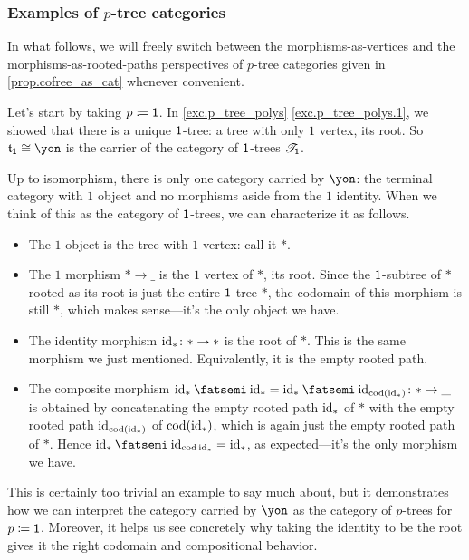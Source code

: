 \documentclass[Book-Poly]{subfiles}
\begin{document}
\subsubsection{Examples of $p$-tree categories}

In what follows, we will freely switch between the morphisms-as-vertices and the morphisms-as-rooted-paths perspectives of $p$-tree categories given in \cref{prop.cofree_as_cat} whenever convenient.

\begin{example}
Let's start by taking $p\coloneqq\textsf{1}$.
In \cref{exc.p_tree_polys} \cref{exc.p_tree_polys.1}, we showed that there is a unique $\textsf{1}$-tree: a tree with only $1$ vertex, its root.
So $\ema{t}_\1\iso\yon$ is the carrier of the category of $\textsf{1}$-trees $\mathscr{T}_{\textsf{1}}$.

Up to isomorphism, there is only one category carried by $\yon$: the terminal category with $1$ object and no morphisms aside from the $1$ identity.
When we think of this as the category of $\textsf{1}$-trees, we can characterize it as follows.
\begin{itemize}
    \item The $1$ object is the tree with $1$ vertex: call it $\ast$.
    \item The $1$ morphism $\ast\to\_$ is the $1$ vertex of $\ast$, its root.
    Since the $\textsf{1}$-subtree of $\ast$ rooted as its root is just the entire $\textsf{1}$-tree $\ast$, the codomain of this morphism is still $\ast$, which makes sense---it's the only object we have.
    \item The identity morphism $\mathrm{id}_\ast\colon\ast\to\ast$ is the root of $\ast$.
    This is the same morphism we just mentioned.
    Equivalently, it is the empty rooted path.
    \item The composite morphism $\id_\ast\then\id_\ast=\id_\ast\then\id_{\cod(\id_\ast)}\colon\ast\to\_$ is obtained by concatenating the empty rooted path $\mathrm{id}_\ast$ of $\ast$ with the empty rooted path $\mathrm{id}_{\operatorname{cod}(\mathrm{id}_\ast)}$ of $\operatorname{cod}(\mathrm{id}_\ast)$, which is again just the empty rooted path of $\ast$.
    Hence $\id_\ast\then\id_{\cod\id_\ast}=\id_\ast$, as expected---it's the only morphism we have.
\end{itemize}
This is certainly too trivial an example to say much about, but it demonstrates how we can interpret the category carried by $\yon$ as the category of $p$-trees for $p\coloneqq\textsf{1}$.
Moreover, it helps us see concretely why taking the identity to be the root gives it the right codomain and compositional behavior.
\end{example}
\end{document}
